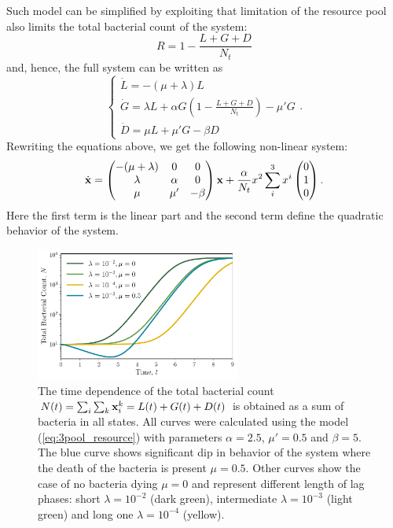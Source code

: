 \documentclass[10pt,A4paper]{article}
\begin{document}
%
Such model can be simplified by exploiting that limitation of the resource pool also limits the total bacterial count of the system:
\begin{equation}
    R = 1 - \frac{L+G+D}{N_t}
\end{equation}
and, hence, the full system can be written as 
\begin{equation}
    \begin{cases}
        \dot{L} = -(\mu + \lambda) L\\
        \dot{G} = \lambda L + \alpha G\left(1-\frac{L+G+D}{N_t}\right)-\mu' G\\
        \dot{D} = \mu  L + \mu' G- \beta D 
        \label{eq:3pool_resource} 
    \end{cases}.
\end{equation}
Rewriting the equations above, we get the following non-linear system:
\begin{equation}
    \dot {\mathbf{x}} = \begin{pmatrix}
        -(\mu + \lambda) & 0       & 0 \\
         \lambda         & \alpha  & 0 \\
         \mu &  \mu'& - \beta 
    \end{pmatrix} 
    \mathbf{x} + \frac{\alpha}{N_t} x^2 \sum_i^3 x^i \begin{pmatrix} 0 \\ 1 \\ 0  \end{pmatrix}.
\end{equation}
Here the first term is the linear part and the second term define the quadratic behavior of the system.
\begin{figure}[t]
    \begin{center}
    \includegraphics[width=0.6\textwidth]{Figures/pool_model_3pools_resource.pdf}
    \caption{
        The time dependence of the total bacterial count $N(t) = \sum_i \sum_k \mathbf{x}_i^k = L(t) + G(t) + D(t)$ is obtained as a sum of bacteria in all states.
        All curves were calculated using the model (\ref{eq:3pool_resource}) with parameters $\alpha=2.5$, $\mu'=0.5$ and $\beta=5$.
        The blue curve shows significant dip in behavior of the system where the death of the bacteria is present $\mu = 0.5$.
        Other curves show the case of no bacteria dying $\mu=0$ and represent different length of lag phases:
        short $\lambda=10^{-2}$ (dark green), intermediate $\lambda=10^{-3}$ (light green) and long one $\lambda=10^{-4}$ (yellow).
    }
    \label{fig:3pool_resource_plots}
    \end{center}
\end{figure}
\end{document}
